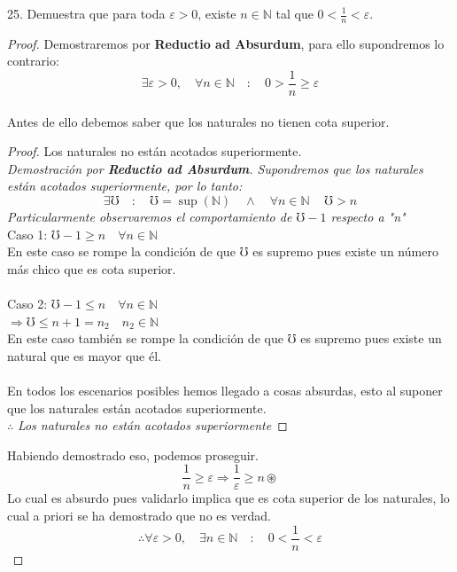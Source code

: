 \documentclass{article}
\begin{document}
  25. Demuestra que para toda \(\varepsilon>0\), existe \(n\in\mathbb{N}\) tal que \(0<\frac{1}{n}<\varepsilon\). \\
\begin{proof}
    Demostraremos por \textbf{Reductio ad Absurdum}, para ello supondremos lo contrario: \\
    \[ \exists \varepsilon > 0 , \quad \forall n \in \mathbb{N} \quad : \quad 0 > \frac{1}{n} \geq \varepsilon \] \\
    Antes de ello debemos saber que los naturales no tienen cota superior.
    \begin{mdframed}
    \begin{proof}
    Los naturales no están acotados superiormente. \\
    \textit{Demostración por \textbf{Reductio ad Absurdum}. Supondremos que los naturales están acotados superiormente, por lo tanto:}
    \[ \exists \mho \quad : \quad \mho = \sup(\mathbb{N}) \quad \land \quad \forall n \in \mathbb{N} \, \quad \mho > n\]
    \textit{Particularmente observaremos el comportamiento de \(\mho - 1\) respecto a "n"} \\
    Caso 1: \(\mho - 1 \geq n \quad \forall n \in \mathbb{N}\) \\
    En este caso se rompe la condición de que $\mho$ es supremo pues existe un número más chico que es cota superior.\\\\
    Caso 2: \(\mho - 1 \leq n \quad \forall n \in \mathbb{N}\) \\
    \( \Rightarrow \mho \leq n+1 = n_2 \quad n_2 \in \mathbb{N}\) \\
    En este caso también se rompe la condición de que $\mho$ es supremo pues existe un natural que es mayor que él.\\\\
    En todos los escenarios posibles hemos llegado a cosas absurdas, esto al suponer que los naturales están acotados superiormente.\\
    $\therefore$ \textit{Los naturales no están acotados superiormente}
    \end{proof}
    \end{mdframed}
    Habiendo demostrado eso, podemos proseguir. \\
    \[ \frac{1}{n} \geq \varepsilon \Rightarrow \frac{1}{\varepsilon} \geq n \circledast \]
    Lo cual es absurdo pues validarlo implica que es cota superior de los naturales, lo cual a priori se ha demostrado que no es verdad.
    \[ \therefore \forall \varepsilon > 0 , \quad \exists n \in \mathbb{N} \quad : \quad 0 < \frac{1}{n} < \varepsilon \]
\end{proof}
  
\end{document}
